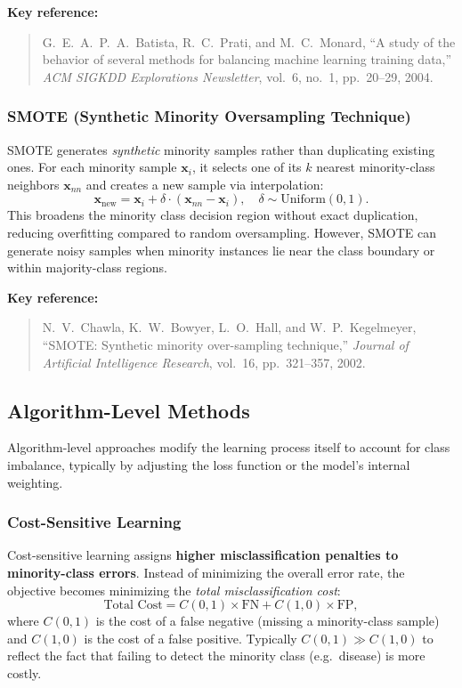 \documentclass[11pt,a4paper]{article}
\begin{document}
\medskip
\noindent\textbf{Key reference:}
\begin{quote}
G.\ E.\ A.\ P.\ A.\ Batista, R.\ C.\ Prati, and M.\ C.\ Monard, ``A study of the behavior of several methods for balancing machine learning training data,'' \textit{ACM SIGKDD Explorations Newsletter}, vol.~6, no.~1, pp.~20--29, 2004.
\end{quote}
 
\subsubsection{SMOTE (Synthetic Minority Oversampling Technique)}
 
SMOTE generates \emph{synthetic} minority samples rather than duplicating existing ones. For each minority sample $\mathbf{x}_i$, it selects one of its $k$ nearest minority-class neighbors $\mathbf{x}_{nn}$ and creates a new sample via interpolation:
\[
\mathbf{x}_{\text{new}} = \mathbf{x}_i + \delta \cdot (\mathbf{x}_{nn} - \mathbf{x}_i), \quad \delta \sim \text{Uniform}(0, 1).
\]
This broadens the minority class decision region without exact duplication, reducing overfitting compared to random oversampling. However, SMOTE can generate noisy samples when minority instances lie near the class boundary or within majority-class regions.
 
\medskip
\noindent\textbf{Key reference:}
\begin{quote}
N.\ V.\ Chawla, K.\ W.\ Bowyer, L.\ O.\ Hall, and W.\ P.\ Kegelmeyer, ``SMOTE: Synthetic minority over-sampling technique,'' \textit{Journal of Artificial Intelligence Research}, vol.~16, pp.~321--357, 2002.
\end{quote}
 
 
\subsection{Algorithm-Level Methods}
 
Algorithm-level approaches modify the learning process itself to account for class imbalance, typically by adjusting the loss function or the model's internal weighting.
 
\subsubsection{Cost-Sensitive Learning}
 
Cost-sensitive learning assigns \textbf{higher misclassification penalties to minority-class errors}. Instead of minimizing the overall error rate, the objective becomes minimizing the \emph{total misclassification cost}:
\[
\text{Total Cost} = C(0,1) \times \text{FN} + C(1,0) \times \text{FP},
\]
where $C(0,1)$ is the cost of a false negative (missing a minority-class sample) and $C(1,0)$ is the cost of a false positive. Typically $C(0,1) \gg C(1,0)$ to reflect the fact that failing to detect the minority class (e.g.\ disease) is more costly.
 
\end{document}
